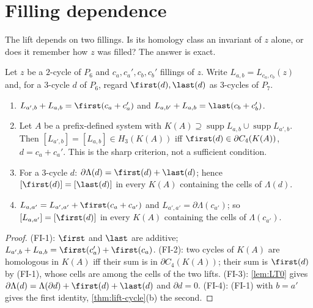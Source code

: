 \section{Filling dependence}\label{sec:filldep}
The lift depends on two fillings. Is its homology class an invariant of $z$ alone, or does it remember how $z$ was filled? The answer is exact.
\begin{theorem}\label{thm:filling-dependence}
Let $z$ be a $2$-cycle of $P_6$ and $c_a,c_a',c_b,c_b'$ fillings of $z$. Write $L_{a,b}=L_{c_a,c_b}(z)$ and, for a $3$-cycle $d$ of $P_6$, regard $\first(d),\last(d)$ as $3$-cycles of $P_7$.
\begin{enumerate}[label=\textup{(FI-\arabic*)}]
\item $L_{a',b}+L_{a,b}=\first(c_a+c_a')$ and $L_{a,b'}+L_{a,b}=\last(c_b+c_b')$.
\item Let $A$ be a prefix-defined system with $K(A)\supseteq\operatorname{supp}L_{a,b}\cup\operatorname{supp}L_{a',b}$. Then $[L_{a',b}]=[L_{a,b}]\in H_3(K(A))$ iff $\first(d)\in\partial C_4(K(A))$, $d=c_a+c_a'$. This is the sharp criterion, not a sufficient condition.
\item For a $3$-cycle $d$: $\partial\Lambda(d)=\first(d)+\last(d)$; hence $[\first(d)]=[\last(d)]$ in every $K(A)$ containing the cells of $\Lambda(d)$.
\item $L_{a,a'}=L_{a',a'}+\first(c_a+c_{a'})$ and $L_{a',a'}=\partial\Lambda(c_{a'})$; so $[L_{a,a'}]=[\first(d)]$ in every $K(A)$ containing the cells of $\Lambda(c_{a'})$.
\end{enumerate}
\end{theorem}
\begin{proof}
(FI-1): $\first$ and $\last$ are additive; $L_{a',b}+L_{a,b}=\first(c_a')+\first(c_a)$. (FI-2): two cycles of $K(A)$ are homologous in $K(A)$ iff their sum is in $\partial C_4(K(A))$; their sum is $\first(d)$ by (FI-1), whose cells are among the cells of the two lifts. (FI-3): \cref{lem:LT0} gives $\partial\Lambda(d)=\Lambda(\partial d)+\first(d)+\last(d)$ and $\partial d=0$. (FI-4): (FI-1) with $b=a'$ gives the first identity, \cref{thm:lift-cycle}(b) the second.
\end{proof}
